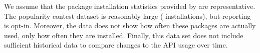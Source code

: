 We assume that the package installation statistics provided by \osdist{} are representative.
The popularity contest dataset is reasonably large (\popsamples{} installations),
but reporting is opt-in.
Moreover,
the data does not show how often these packages
are actually used, only how often they are installed.
Finally, this data set does not include sufficient historical data
to compare changes to the API usage over time.








